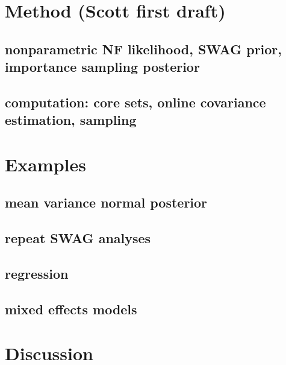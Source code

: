 \documentclass[11pt, oneside]{article}   	%
\begin{document}
\section{Method (Scott first draft)}

\subsection{nonparametric NF likelihood, SWAG prior, importance sampling posterior}
\subsection{computation: core sets, online covariance estimation, sampling}

\section{Examples}
\subsection{mean variance normal posterior}
\subsection{repeat SWAG analyses}
\subsection{regression}
\subsection{mixed effects models}

\section{Discussion}
\end{document}
